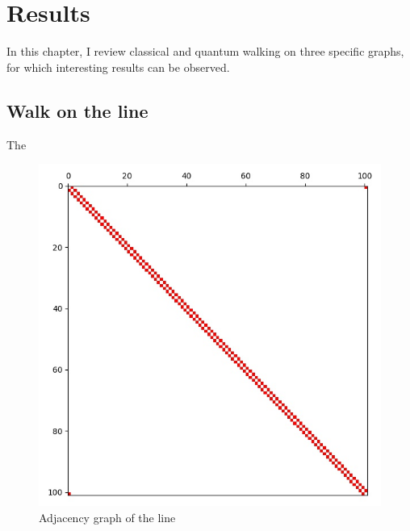 \chapter{Results}

In this chapter, I review classical and quantum walking on three specific graphs, for which interesting results can be observed.

\section{Walk on the line}

The

\begin{figure}[H]
\centering
\includegraphics[width=0.5\linewidth]{./figures/results/path/graph.jpg}
\caption{Adjacency graph of the line}
\end{figure}

